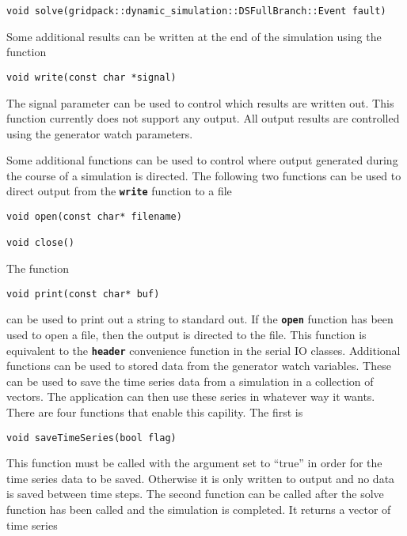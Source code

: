 {
\color{red}
\begin{Verbatim}[fontseries=b]
void solve(gridpack::dynamic_simulation::DSFullBranch::Event fault)
\end{Verbatim}
}

Some additional results can be written at the end of the simulation using the function

{
\color{red}
\begin{Verbatim}[fontseries=b]
void write(const char *signal)
\end{Verbatim}
}

The signal parameter can be used to control which results are written out. This function currently does not support any output. All output results are controlled using the generator watch parameters.

Some additional functions can be used to control where output generated during the course of a simulation is directed. The following two functions can be used to direct output from the \texttt{\textbf{write}} function to a file

{
\color{red}
\begin{Verbatim}[fontseries=b]
void open(const char* filename)

void close()
\end{Verbatim}
}

The function

{
\color{red}
\begin{Verbatim}[fontseries=b]
void print(const char* buf)
\end{Verbatim}
}

can be used to print out a string to standard out. If the \texttt{\textbf{open}} function has been used to open a file, then the output is directed to the file. This function is equivalent to the \texttt{\textbf{header}} convenience function in the serial IO classes.
Additional functions can be used to stored data from the generator watch variables. These can be used to save the time series data from a simulation in a collection of vectors. The application can then use these series in whatever way it wants. There are four functions that enable this capility. The first is

{
\color{red}
\begin{Verbatim}[fontseries=b]
void saveTimeSeries(bool flag)
\end{Verbatim}
}

This function must be called with the argument set to ``true'' in order for the time series data to be saved. Otherwise it is only written to output and no data is saved between time steps. The second function can be called after the solve function has been called and the simulation is completed. It returns a vector of time series

